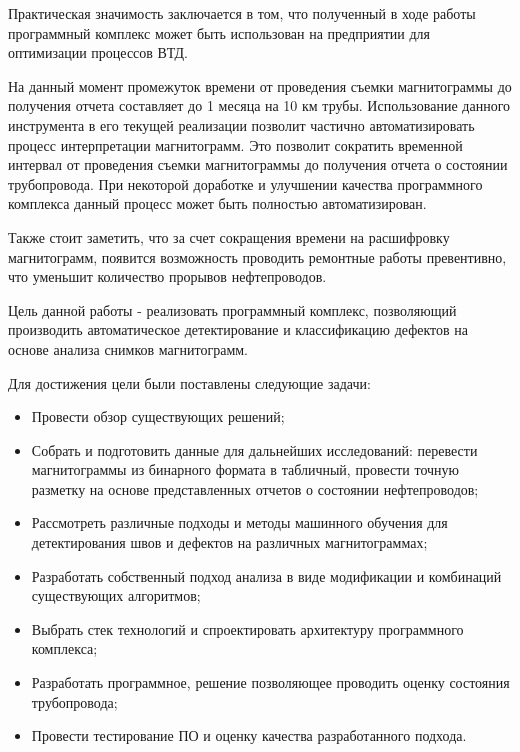 \documentclass[a4paper,article,14pt]{extarticle}
\begin{document}
Практическая значимость заключается в том, что полученный в ходе работы программный комплекс может быть 
использован на предприятии для оптимизации процессов ВТД. 

На данный момент промежуток времени от проведения съемки магнитограммы до получения отчета составляет 
до 1 месяца на 10 км трубы. Использование данного инструмента в его текущей реализации позволит частично 
автоматизировать процесс интерпретации магнитограмм. Это позволит сократить временной интервал от проведения 
съемки магнитограммы до получения отчета о состоянии трубопровода. При некоторой доработке и улучшении качества программного 
комплекса данный процесс может быть полностью автоматизирован.

Также стоит заметить, что за счет сокращения времени на расшифровку магнитограмм, появится возможность 
проводить ремонтные работы превентивно, что уменьшит количество прорывов нефтепроводов.


\pagebreak
{}

Цель данной работы - реализовать программный комплекс, позволяющий производить автоматическое детектирование и классификацию дефектов на основе анализа снимков магнитограмм. 

\pagebreak
{}

Для достижения цели были поставлены следующие задачи:

\begin{itemize}
    \item Провести обзор существующих решений;
    \item Собрать и подготовить данные для дальнейших исследований: перевести магнитограммы из бинарного формата в табличный, 
    провести точную разметку на основе представленных отчетов о состоянии нефтепроводов;
    \item Рассмотреть различные подходы и методы машинного обучения для детектирования швов и дефектов на различных магнитограммах;
    \item Разработать собственный подход анализа в виде модификации и комбинаций существующих алгоритмов;
    \item Выбрать стек технологий и спроектировать архитектуру программного комплекса;
    \item Разработать программное, решение позволяющее проводить оценку состояния трубопровода;
    \item Провести тестирование ПО и оценку качества разработанного подхода.
\end{itemize}
\end{document}
